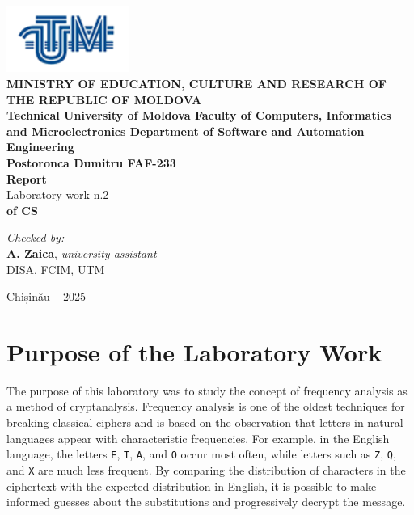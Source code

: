 \documentclass[12pt]{article}
\begin{document}
\begin{titlepage}
\begin{center}
    \includegraphics[width=0.3\textwidth]{image.png} \\[0.2cm]
    
    \textbf{MINISTRY OF EDUCATION, CULTURE AND RESEARCH 
OF THE REPUBLIC OF MOLDOVA} \\[0.3cm]
    
    \textbf{Technical University of Moldova 
Faculty of Computers, Informatics and Microelectronics 
Department of Software and Automation Engineering} \\[2cm]
    
    \textbf{Postoronca Dumitru FAF-233}\\[0.5cm]
    
    \Huge \textbf{Report} \\[0.5cm]
    
    \large Laboratory work n.2 \\[0.5cm]
    
    \textbf{of CS} \\[3cm]
    
    \begin{flushright}
        \textit{Checked by:} \\
        \textbf{A. Zaica}, \textit{university assistant} \\
        DISA, FCIM, UTM
    \end{flushright}
    
    \vfill
    
    Chișinău -- 2025
\end{center}
\end{titlepage}


\newpage
\setcounter{page}{1}
\pagestyle{fancy}
\fancyhf{}
\rhead{\thepage}

\section{Purpose of the Laboratory Work}
The purpose of this laboratory was to study the concept of frequency analysis as a method of 
cryptanalysis. Frequency analysis is one of the oldest techniques for breaking classical ciphers 
and is based on the observation that letters in natural languages appear with characteristic 
frequencies. For example, in the English language, the letters \texttt{E}, \texttt{T}, \texttt{A}, 
and \texttt{O} occur most often, while letters such as \texttt{Z}, \texttt{Q}, and \texttt{X} 
are much less frequent. By comparing the distribution of characters in the ciphertext with the 
expected distribution in English, it is possible to make informed guesses about the substitutions 
and progressively decrypt the message.
\end{document}
